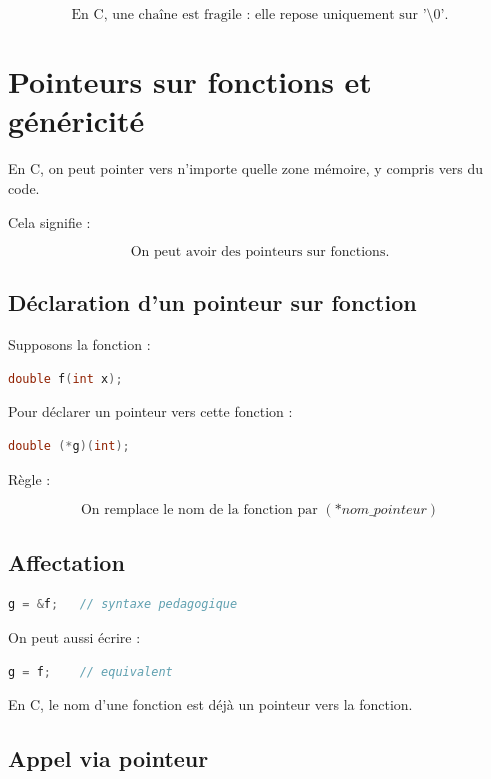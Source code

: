 \[
\boxed{
\text{En C, une chaîne est fragile : elle repose uniquement sur '\textbackslash 0'.}
}
\]

\section{Pointeurs sur fonctions et généricité}

En C, on peut pointer vers n’importe quelle zone mémoire,
y compris vers du code.

Cela signifie :

\[
\boxed{\text{On peut avoir des pointeurs sur fonctions.}}
\]

\subsection{Déclaration d’un pointeur sur fonction}

Supposons la fonction :

\begin{lstlisting}[language=C]
double f(int x);
\end{lstlisting}

Pour déclarer un pointeur vers cette fonction :

\begin{lstlisting}[language=C]
double (*g)(int);
\end{lstlisting}

Règle :

\[
\text{On remplace le nom de la fonction par } (*nom\_pointeur)
\]

\subsection{Affectation}

\begin{lstlisting}[language=C]
g = &f;   // syntaxe pedagogique
\end{lstlisting}

On peut aussi écrire :

\begin{lstlisting}[language=C]
g = f;    // equivalent
\end{lstlisting}

En C, le nom d’une fonction est déjà un pointeur vers la fonction.

\subsection{Appel via pointeur}

